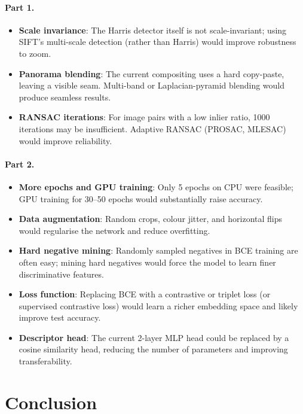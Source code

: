 \documentclass[11pt,letterpaper]{article}
\begin{document}
\paragraph{Part 1.}
\begin{itemize}[noitemsep]
  \item \textbf{Scale invariance}: The Harris detector itself is not scale-invariant; using SIFT's multi-scale detection (rather than Harris) would improve robustness to zoom.
  \item \textbf{Panorama blending}: The current compositing uses a hard copy-paste, leaving a visible seam. Multi-band or Laplacian-pyramid blending would produce seamless results.
  \item \textbf{RANSAC iterations}: For image pairs with a low inlier ratio, 1000 iterations may be insufficient. Adaptive RANSAC (PROSAC, MLESAC) would improve reliability.
\end{itemize}

\paragraph{Part 2.}
\begin{itemize}[noitemsep]
  \item \textbf{More epochs and GPU training}: Only 5 epochs on CPU were feasible; GPU training for 30--50 epochs would substantially raise accuracy.
  \item \textbf{Data augmentation}: Random crops, colour jitter, and horizontal flips would regularise the network and reduce overfitting.
  \item \textbf{Hard negative mining}: Randomly sampled negatives in BCE training are often easy; mining hard negatives would force the model to learn finer discriminative features.
  \item \textbf{Loss function}: Replacing BCE with a contrastive or triplet loss (or supervised contrastive loss) would learn a richer embedding space and likely improve test accuracy.
  \item \textbf{Descriptor head}: The current 2-layer MLP head could be replaced by a cosine similarity head, reducing the number of parameters and improving transferability.
\end{itemize}

\section{Conclusion}
\end{document}
